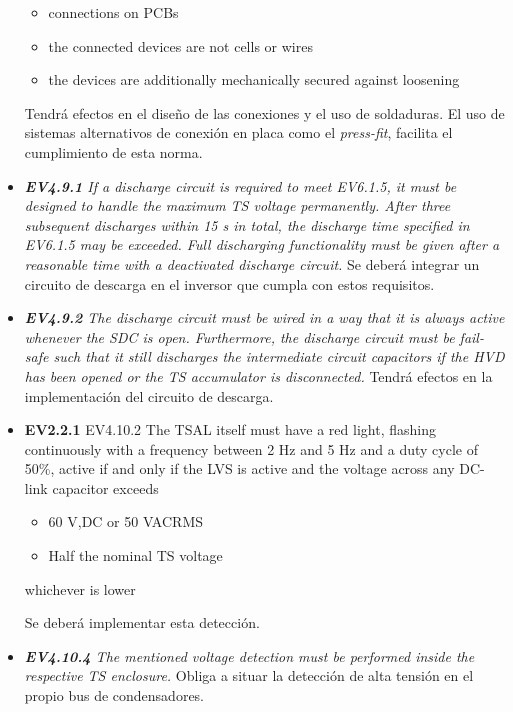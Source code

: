 \begin{itemize}
\begin{itquote}
    \begin{itemize}
            \item connections on PCBs
            \item the connected devices are not cells or wires
            \item the devices are additionally mechanically secured against loosening
    \end{itemize} \end{itquote} Tendrá efectos en el diseño de las conexiones y el uso de soldaduras. El uso de sistemas alternativos de conexión en placa como el \textit{press-fit}, facilita el cumplimiento de esta norma.
    \item \textit{\textbf{EV4.9.1} If a discharge circuit is required to meet EV6.1.5, it must be designed to handle the maximum TS voltage permanently. After three subsequent discharges within 15 s in total, the discharge time specified in EV6.1.5 may be exceeded.  Full discharging functionality must be given after a reasonable time with a deactivated discharge circuit.} Se deberá integrar un circuito de descarga en el inversor que cumpla con estos requisitos.
    \item \textit{\textbf{EV4.9.2} The discharge circuit must be wired in a way that it is always active whenever the SDC is open. Furthermore, the discharge circuit must be fail-safe such that it still discharges the intermediate circuit capacitors if the HVD has  been opened or the TS accumulator is disconnected.} Tendrá efectos en la implementación del circuito de descarga.
    \item \begin{itquote} \textbf{EV2.2.1} EV4.10.2 The TSAL itself must have a red light, flashing continuously with a frequency between 2 Hz and 5 Hz and a duty cycle of 50\%, active if and only if the LVS is active and the voltage across any DC-link capacitor exceeds 
    \begin{itemize}
            \item 60 V,DC or 50 VACRMS
            \item Half the nominal TS voltage
    \end{itemize} 
    whichever is lower \end{itquote} Se deberá implementar esta detección.
    \item \textit{\textbf{EV4.10.4} The mentioned voltage detection must be performed inside the respective TS enclosure.} Obliga a situar la detección de alta tensión en el propio bus de condensadores.

\end{itemize}

